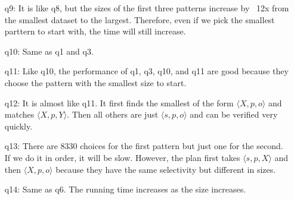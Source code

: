 \documentclass{article}
\begin{document}
\begin{enumerate}
\begin{enumerate}
\item[q9:] It is like q8, but the sizes of the first three patterns increase by ~12x from the smallest dataset to the largest. Therefore, even if we pick the smallest parttern to start with, the time will still increase. 
\item[q10:] Same as q1 and q3. 
\item[q11:] Like q10, the performance of q1, q3, q10, and q11 are good because they choose the pattern with the smallest size to start.
\item[q12:] It is almost like q11. It first finds the smallest of the form $\langle X, p, o\rangle$ and matches $\langle X, p, Y\rangle$. Then all others are just $\langle s, p, o\rangle$ and can be verified very quickly. 
\item[q13:] There are 8330 choices for the first pattern but just one for the second. If we do it in order, it will be slow. However, the plan first takes $\langle s, p, X\rangle$ and then $\langle X, p, o\rangle$ because they have the same selectivity but different in sizes.
\item[q14:] Same as q6. The running time increases as the size increases. 
\end{enumerate}
\end{enumerate}

\newpage
\end{document}
